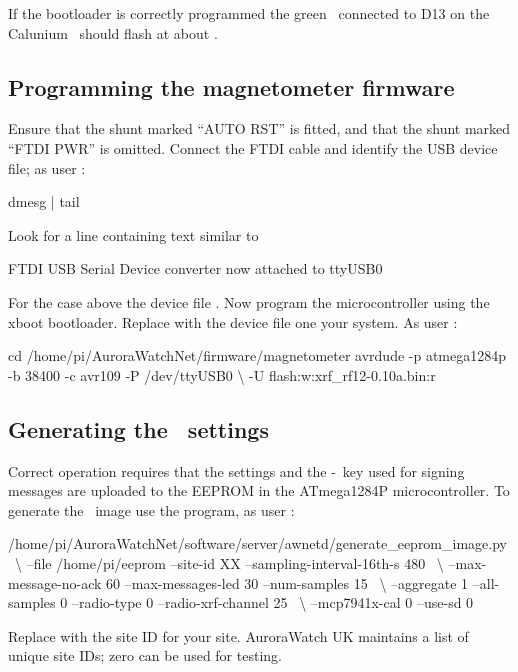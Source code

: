 If the bootloader is correctly programmed the green \led\ connected to
D13 on the Calunium \pcb\ should flash at about .

\subsection{Programming the magnetometer firmware}
Ensure that the shunt marked ``AUTO RST'' is fitted, and that the
shunt marked ``FTDI PWR'' is omitted. Connect the FTDI cable and
identify the USB device file; as user \piUser:
\begin{Cmd}
dmesg | tail
\end{Cmd}

Look for a line containing text similar to
\begin{Cmd}
FTDI USB Serial Device converter now attached to ttyUSB0
\end{Cmd}
For the case above the device file . Now
program the microcontroller using the xboot bootloader. Replace
 with the device file one your system. As user
\piUser:
\begin{Cmd}
cd /home/pi/AuroraWatchNet/firmware/magnetometer
avrdude -p atmega1284p -b 38400 -c avr109 -P /dev/ttyUSB0 \textbackslash
      -U flash:w:xrf_rf12-0.10a.bin:r
\end{Cmd}



\subsection[Generating the EEPROM settings]{Generating the \eeprom\
  settings}
\label{sec:generate-eeprom-settings}
Correct operation requires that the settings and the \hmac-\mdfive\
key used for signing messages are uploaded to the EEPROM in the
ATmega1284P microcontroller. To generate the \eeprom\ image use the
\filename{generate_eeprom_image} program, as user \piUser:
\begin{Cmd}[fontsize=\small]
/home/pi/AuroraWatchNet/software/server/awnetd/generate_eeprom_image.py \
\textbackslash
--file /home/pi/eeprom --site-id XX --sampling-interval-16th-s 480 \
\textbackslash
--max-message-no-ack 60 --max-messages-led 30 --num-samples 15 \
\textbackslash
--aggregate 1 --all-samples 0 --radio-type 0 --radio-xrf-channel 25 \
\textbackslash
--mcp7941x-cal 0 --use-sd 0
\end{Cmd}
Replace \filename{XX} with the site ID for your site. AuroraWatch UK
maintains a list of unique site IDs; zero can be used for testing.

